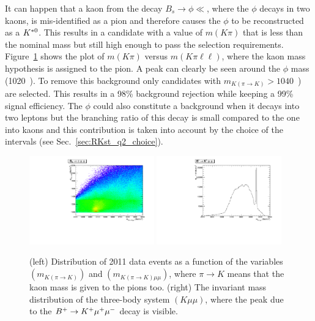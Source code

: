 It can happen that a kaon from the decay $B_s \rightarrow \phi \ll$, where the $\phi$ decays in two kaons,
is mis-identified as a pion and therefore causes the $\phi$ to be reconstructed as a ${{K}^{*0}}$. This results in
a candidate with a value of $m(K\pi)$ that is less than the nominal \Kstarz mass but still high enough to
pass the selection requirements. Figure~\ref{fig:phiplots} shows the plot of $m(K\pi)$ versus
$m(K\pi \ell\ell)$, where the kaon mass hypothesis is assigned to the pion. A peak can clearly be seen
around the $\phi$ mass (1020~\mevcc).
To remove this background only candidates with $m_{K(\pi\rightarrow K)} > 1040$~\mevcc) are selected.
This results in a 98\% background rejection while keeping a 99\% signal efficiency.
The $\phi$ could also constitute a background when it decays into two leptons but the
branching ratio of this decay is small compared to the one into kaons and this
contribution is taken into account by the choice of the \qsq intervals (see Sec.~\ref{sec:RKst_q2_choice}).

\begin{center}
\begin{figure}[h!]
\centering 
\includegraphics[width=0.48\textwidth]{RKst/figs/RKst/phi.pdf}
\includegraphics[width=0.48\textwidth]{RKst/figs/RKst/Kmumu.pdf}
\caption{ (left) Distribution of 2011 data events as a function of the variables $(m_{K(\pi\rightarrow K)})$ 
and $(m_{K(\pi\rightarrow K)\mu\mu})$, where $\pi\rightarrow K$ means that the kaon mass is given 
to the pions too. (right) The invariant mass distribution of the three-body system $(K\mu\mu)$,
where the peak due to the $B^+ \rightarrow K^+ {\mu^+\mu^-}$ decay is visible. }
\label{fig:phiplots}
\end{figure}
\end{center}


